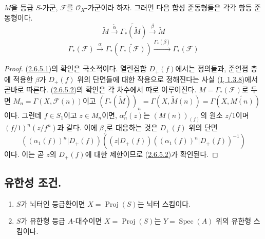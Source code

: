 \begin{proposition}[2.6.5]
\label{II.2.6.5-ko}
$M$을 등급 $S$-가군, $\mathcal{F}$를 $\mathcal{O}_X$-가군이라 하자.
그러면 다음 합성 준동형들은 각각 항등 준동형이다.
\[
\label{II.2.6.5.1-ko}
  \widetilde{M}\xrightarrow{\widetilde{\alpha}}
  \widetilde{\Gamma_*(\widetilde{M})}
  \xrightarrow{\beta}\widetilde{M}
\tag{2.6.5.1}
\]
\[
\label{II.2.6.5.2-ko}
  \Gamma_*(\mathcal{F})\xrightarrow{\alpha}
  \Gamma_*(\widetilde{\Gamma_*(\mathcal{F})})
  \xrightarrow{\Gamma_*(\beta)}\Gamma_*(\mathcal{F})
\tag{2.6.5.2}
\]
\end{proposition}

\begin{proof}
(\hyperref[II.2.6.5.1-ko]{2.6.5.1})의 확인은 국소적이다. 열린집합
$D_+(f)$에서는 정의들과, 준연접 층에 적용한 $\beta$가 $D_+(f)$ 위의
단면들에 대한 작용으로 정해진다는 사실
(\hyperref[I.1.3.8-ko]{I, 1.3.8})에서 곧바로 따른다.
(\hyperref[II.2.6.5.2-ko]{2.6.5.2})의 확인은 각 차수에서 따로 이루어진다.
$M=\Gamma_*(\mathcal{F})$로 두면
$M_n=\Gamma(X,\mathcal{F}(n))$이고
$(\Gamma_*(\widetilde{M}))_n=\Gamma(X,\widetilde{M}(n))
=\Gamma(X,\widetilde{M(n)})$이다. 그런데 $f\in S_1$이고 $z\in M_n$이면,
$\alpha_n^f(z)$는 $(M(n))_{(f)}$의 원소 $z/1$이며
$(f/1)^n(z/f^n)$과 같다. 이에 $\beta_f$로 대응하는 것은 $D_+(f)$ 위의
단면
\[
  ((\alpha_1(f))^n|D_+(f))
  ((z|D_+(f))((\alpha_1(f))^n|D_+(f))^{-1})
\]
이다. 이는 곧 $z$의 $D_+(f)$에 대한 제한이므로
(\hyperref[II.2.6.5.2-ko]{2.6.5.2})가 확인된다.
\end{proof}

\subsection{유한성 조건.}
\label{subsection:II.2.7-ko}

\begin{proposition}[2.7.1]
\label{II.2.7.1-ko}
\begin{enumerate}
  \item[\rm(i)] $S$가 뇌터인 등급환이면
    $X=\operatorname{Proj}(S)$는 뇌터 스킴이다.
  \item[\rm(ii)] $S$가 유한형 등급 $A$-대수이면
    $X=\operatorname{Proj}(S)$는 $Y=\operatorname{Spec}(A)$ 위의
    유한형 스킴이다.
\end{enumerate}
\end{proposition}


